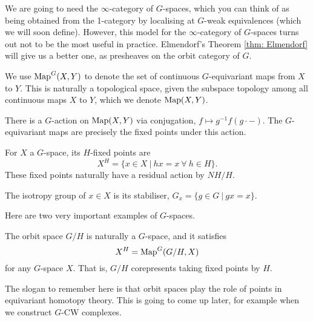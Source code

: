 We are going to need the $\infty$-category of $G$-spaces, which you can think of as being obtained from the 1-category by localising at $G$-weak equivalences (which we will soon define). However, this model for the $\infty$-category of $G$-spaces turns out not to be the most useful in practice. Elmendorf's Theorem \ref{thm: Elmendorf} will give us a better one, as presheaves on the orbit category of $G$.

\begin{ntn} We use $\operatorname{Map}^G(X, Y)$ to denote the set of continuous $G$-equivariant maps from $X$ to $Y$. This is naturally a topological space, given the subspace topology among all continuous maps $X$ to $Y$, which we denote $\operatorname{Map}(X, Y)$. 
\end{ntn}

There is a $G$-action on $\operatorname{Map}(X, Y)$ via conjugation, $f \mapsto g^{-1}f(g \cdot -)$. The $G$-equivariant maps are precisely the fixed points under this action.

\begin{defn} For $X$ a $G$-space, its $H$-fixed points are 
    \[X^H = \{x \in X~|~ hx = x ~\forall~ h \in H\}.\] 
    These fixed points naturally have a residual action by $NH/H$. 
\end{defn}

\begin{defn} 
    The isotropy group of $x \in X$ is its stabiliser, $G_x = \{g \in G ~|~ gx = x\}$.
\end{defn}

Here are two very important examples of $G$-spaces.

\begin{example}
    The orbit space $G/H$ is naturally a $G$-space, and it satisfies
    \[X^H = \operatorname{Map}^G(G/H, X)\]
    for any $G$-space $X$. That is, $G/H$ corepresents taking fixed points by $H$. 
\end{example}

The slogan to remember here is that orbit spaces play the role of points in equivariant homotopy theory. This is going to come up later, for example when we construct $G$-CW complexes. 

